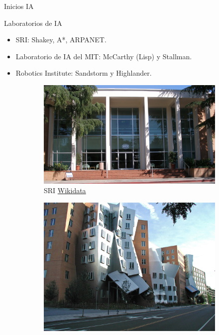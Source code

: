 
\begin{frame}[fragile]{Inicios IA}
	\vspace{10px}
	\pause
	\begin{block}{Laboratorios de IA}
		\begin{itemize}
			\item SRI: Shakey, A*, ARPANET.
			\pause
			\item Laboratorio de IA del MIT: McCarthy (Lisp) y Stallman.
			\pause
			\item Robotics Institute: Sandstorm y Highlander.
		\end{itemize}
	\end{block}
	\begin{figure}
		\centering
		\pause
		\begin{subfigure}{0.33\textwidth}
			\centering
			\includegraphics[scale=0.038]{./EtapaModerna/Imagenes/sri.jpg}
			\caption{SRI \href{https://es.m.wikipedia.org/wiki/Archivo:SRI_International_HQ.jpg}{Wikidata}}
		\end{subfigure}
		\pause
		\begin{subfigure}{0.32\textwidth}
			\centering
			\includegraphics[scale=0.04]{./EtapaModerna/Imagenes/mit_ai.jpg}

\end{subfigure}
\end{figure}
\end{frame}
